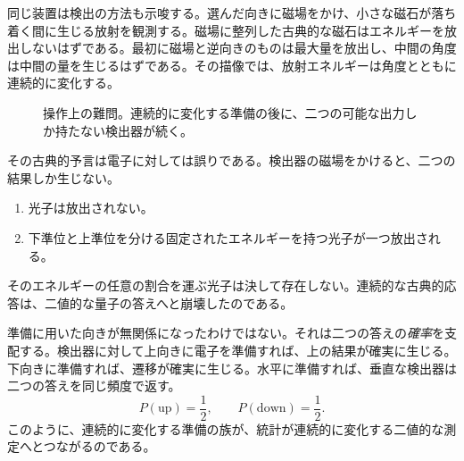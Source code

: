 同じ装置は検出の方法も示唆する。選んだ向きに磁場をかけ、小さな磁石が落ち着く間に生じる放射を観測する。磁場に整列した古典的な磁石はエネルギーを放出しないはずである。最初に磁場と逆向きのものは最大量を放出し、中間の角度は中間の量を生じるはずである。その描像では、放射エネルギーは角度とともに連続的に変化する。

\begin{figure}[htbp]
\centering
\begin{coursefitfigure}
\end{coursefitfigure}
\caption{操作上の難問。連続的に変化する準備の後に、二つの可能な出力しか持たない検出器が続く。}
\end{figure}

その古典的予言は電子に対しては誤りである。検出器の磁場をかけると、二つの結果しか生じない。
\begin{enumerate}
  \item 光子は放出されない。
  \item 下準位と上準位を分ける固定されたエネルギーを持つ光子が一つ放出される。
\end{enumerate}
そのエネルギーの任意の割合を運ぶ光子は決して存在しない。連続的な古典的応答は、二値的な量子の答えへと崩壊したのである。

準備に用いた向きが無関係になったわけではない。それは二つの答えの\emph{確率}を支配する。検出器に対して上向きに電子を準備すれば、上の結果が確実に生じる。下向きに準備すれば、遷移が確実に生じる。水平に準備すれば、垂直な検出器は二つの答えを同じ頻度で返す。
\begin{equation}
  P(\text{up})=\frac12,
  \qquad
  P(\text{down})=\frac12.
  \label{eq:l02-horizontal-probabilities}
\end{equation}
このように、連続的に変化する準備の族が、統計が連続的に変化する二値的な測定へとつながるのである。

